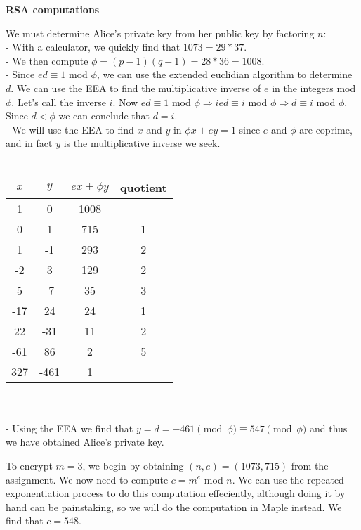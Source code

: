 \documentclass[12pt]{article}
\begin{document}
\begin{list}{.}{}
\item \textbf{RSA computations}
\begin{list}{)}{}
\item We must determine Alice's private key from her public key by factoring
$n$:\\
- With a calculator, we quickly find that $1073 = 29 * 37$.\\
- We then compute $\phi = (p-1)(q-1) = 28 * 36 = 1008$.\\
- Since $ed \equiv 1$ mod $\phi$, we can use the extended euclidian algorithm to
determine $d$.  We can use the EEA to find the multiplicative inverse of $e$ in
the integers mod $\phi$.  Let's call the inverse $i$.  Now $ed \equiv 1$ mod
$\phi \Rightarrow ied \equiv i$ mod $\phi \Rightarrow d \equiv i$ mod $\phi$.
Since $d < \phi$ we can conclude that $d = i$.\\
- We will use the EEA to find $x$ and $y$ in $\phi x + ey = 1$ since $e$ and
$\phi$ are coprime, and in fact $y$ is the multiplicative inverse we seek.\\
\\
\begin{tabular}{|c|c|c|c|}
\hline
$x$ & $y$ & $ex + \phi y$ & quotient\\
\hline
1 & 0 & 1008 & \\
0 & 1 & 715 & 1 \\
1 & -1 & 293 & 2 \\
-2 & 3 & 129 & 2 \\
5 & -7 & 35 & 3 \\
-17 & 24 & 24 & 1 \\
22 & -31 & 11 & 2 \\
-61 & 86 & 2 & 5 \\
327 & -461 & 1 & \\
\hline
\end{tabular}\\
\\
- Using the EEA we find that $y = d = -461 \pmod \phi \equiv 547 \pmod \phi$ and
thus we have obtained Alice's private key.

\item To encrypt $m = 3$, we begin by obtaining $(n,e) = (1073, 715)$ from the
assignment.  We now need to compute $c = m^e$ mod $n$.  We can use the repeated
exponentiation process to do this computation effeciently, although doing it by
hand can be painstaking, so we will do the computation in Maple instead.  We
find that $c = 548$.


\end{list}
\end{list}
\end{document}
